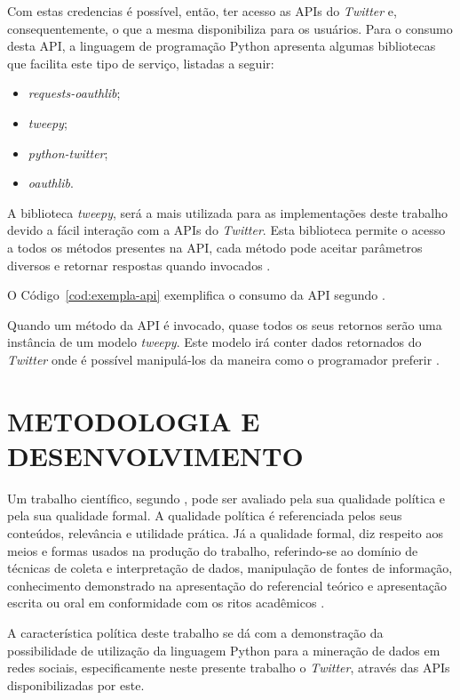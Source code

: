 Com estas credencias é possível, então, ter acesso as APIs do \textit{Twitter} e, consequentemente, o que a mesma disponibiliza para os usuários. Para o consumo desta API, a linguagem de programação Python apresenta algumas bibliotecas que facilita este tipo de serviço, listadas a seguir:

\begin{itemize}
	\item \textit{requests-oauthlib};
	\item \textit{tweepy};
	\item \textit{python-twitter};
	\item \textit{oauthlib}.
\end{itemize}

A biblioteca \textit{tweepy}, será a mais utilizada para as implementações deste trabalho devido a fácil interação com a APIs do \textit{Twitter}. Esta biblioteca permite o acesso a todos os métodos presentes na API, cada método pode aceitar parâmetros diversos e retornar respostas quando invocados \cite{tweepy}.

O Código~\ref{cod:exempla-api} exemplifica o consumo da API segundo .



Quando um método da API é invocado, quase todos os seus retornos serão uma instância de um modelo \textit{tweepy}. Este modelo irá conter dados retornados do \textit{Twitter} onde é possível manipulá-los da maneira como o programador preferir \cite{tweepy}.


\section{METODOLOGIA E DESENVOLVIMENTO}\label{sec: metodologia}
Um trabalho científico, segundo , pode ser avaliado pela sua qualidade política e pela sua qualidade formal. A qualidade política é referenciada pelos seus conteúdos, relevância e utilidade prática. Já a qualidade formal, diz respeito aos meios e formas usados na produção do trabalho, referindo-se ao domínio de técnicas de coleta e interpretação de dados, manipulação de fontes de informação, conhecimento demonstrado na apresentação do referencial teórico e apresentação escrita ou oral em conformidade com os ritos acadêmicos \cite{metodologia}.

A característica política deste trabalho se dá com a demonstração da possibilidade de utilização da linguagem Python para a mineração de dados em redes sociais, especificamente neste presente trabalho o \textit{Twitter}, através das APIs disponibilizadas por este.

